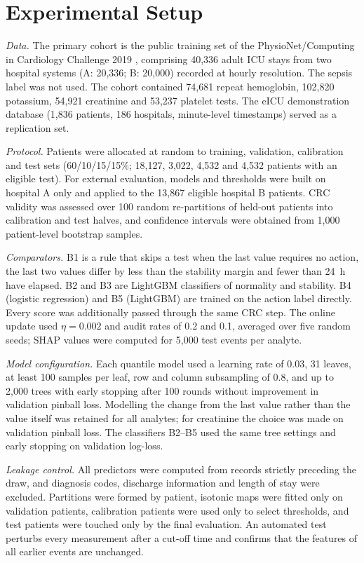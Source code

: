 \documentclass[conference]{IEEEtran}
\begin{document}
\section{Experimental Setup}
\textit{Data.} The primary cohort is the public training set of the PhysioNet/Computing in Cardiology Challenge 2019 \cite{reyna2020sepsis,goldberger2000physionet}, comprising 40,336 adult ICU stays from two hospital systems (A: 20,336; B: 20,000) recorded at hourly resolution. The sepsis label was not used. The cohort contained 74,681 repeat hemoglobin, 102,820 potassium, 54,921 creatinine and 53,237 platelet tests. The eICU demonstration database \cite{pollard2018eicu} (1,836 patients, 186 hospitals, minute-level timestamps) served as a replication set.

\textit{Protocol.} Patients were allocated at random to training, validation, calibration and test sets (60/10/15/15\%; 18,127, 3,022, 4,532 and 4,532 patients with an eligible test). For external evaluation, models and thresholds were built on hospital A only and applied to the 13,867 eligible hospital B patients. CRC validity was assessed over 100 random re-partitions of held-out patients into calibration and test halves, and confidence intervals were obtained from 1,000 patient-level bootstrap samples.

\textit{Comparators.} B1 is a rule that skips a test when the last value requires no action, the last two values differ by less than the stability margin and fewer than 24~h have elapsed. B2 and B3 are LightGBM classifiers of normality and stability. B4 (logistic regression) and B5 (LightGBM) are trained on the action label directly. Every score was additionally passed through the same CRC step. The online update used $\eta=0.002$ and audit rates of 0.2 and 0.1, averaged over five random seeds; SHAP values were computed for 5,000 test events per analyte.

\textit{Model configuration.} Each quantile model used a learning rate of 0.03, 31 leaves, at least 100 samples per leaf, row and column subsampling of 0.8, and up to 2,000 trees with early stopping after 100 rounds without improvement in validation pinball loss. Modelling the change from the last value rather than the value itself was retained for all analytes; for creatinine the choice was made on validation pinball loss. The classifiers B2--B5 used the same tree settings and early stopping on validation log-loss.

\textit{Leakage control.} All predictors were computed from records strictly preceding the draw, and diagnosis codes, discharge information and length of stay were excluded. Partitions were formed by patient, isotonic maps were fitted only on validation patients, calibration patients were used only to select thresholds, and test patients were touched only by the final evaluation. An automated test perturbs every measurement after a cut-off time and confirms that the features of all earlier events are unchanged.
\end{document}
